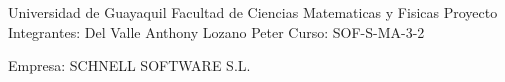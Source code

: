 \begin{center}
Universidad de Guayaquil
Facultad de Ciencias Matematicas y Fisicas
Proyecto
Integrantes:
Del Valle Anthony
Lozano Peter
Curso: SOF-S-MA-3-2
\end{center}

Empresa: SCHNELL SOFTWARE S.L.


